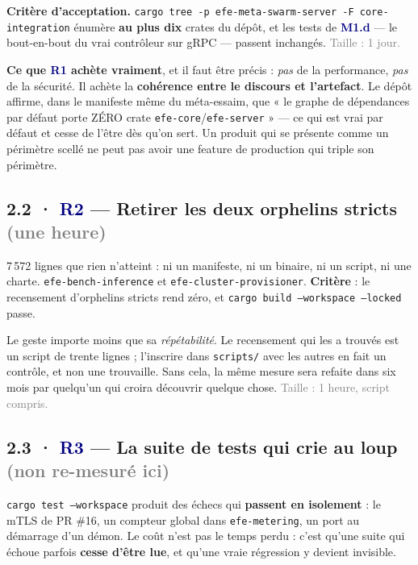 \documentclass[10pt]{article}
\newcommand{\sz}[1]{\textcolor{grey}{\small\textsf{#1}}}
\newcommand{\code}[1]{\texttt{\small #1}}
\newcommand{\mm}[1]{\textbf{\textcolor{navy}{#1}}}
\begin{document}
\textbf{Critère d'acceptation.} \code{cargo tree -p efe-meta-swarm-server -F core-integration}
énumère \textbf{au plus dix} crates du dépôt, et les tests de \mm{M1.d} --- le bout-en-bout du vrai
contrôleur sur gRPC --- passent inchangés. \sz{Taille : 1 jour.}

\begin{piste}
\textbf{Ce que \mm{R1} achète vraiment}, et il faut être précis : \emph{pas} de la performance,
\emph{pas} de la sécurité. Il achète la \textbf{cohérence entre le discours et l'artefact}. Le
dépôt affirme, dans le manifeste même du méta-essaim, que « le graphe de dépendances par défaut
porte ZÉRO crate \code{efe-core}/\code{efe-server} » --- ce qui est vrai par défaut et cesse de
l'être dès qu'on sert. Un produit qui se présente comme un périmètre scellé ne peut pas avoir une
feature de production qui triple son périmètre.
\end{piste}

\subsection{2.2 · \mm{R2} --- Retirer les deux orphelins stricts \sz{(une heure)}}

7\,572 lignes que rien n'atteint : ni un manifeste, ni un binaire, ni un script, ni une charte.
\code{efe-bench-inference} et \code{efe-cluster-provisioner}. \textbf{Critère} : le recensement
d'orphelins stricts rend zéro, et \code{cargo build --workspace --locked} passe.

Le geste importe moins que sa \emph{répétabilité}. Le recensement qui les a trouvés est un script
de trente lignes ; l'inscrire dans \code{scripts/} avec les autres en fait un contrôle, et non une
trouvaille. Sans cela, la même mesure sera refaite dans six mois par quelqu'un qui croira découvrir
quelque chose. \sz{Taille : 1 heure, script compris.}

\subsection{2.3 · \mm{R3} --- La suite de tests qui crie au loup \sz{(non re-mesuré ici)}}

\code{cargo test --workspace} produit des échecs qui \textbf{passent en isolement} : le mTLS de
PR \#16, un compteur global dans \code{efe-metering}, un port au démarrage d'un démon. Le coût n'est
pas le temps perdu : c'est qu'une suite qui échoue parfois \textbf{cesse d'être lue}, et qu'une
vraie régression y devient invisible.
\end{document}
